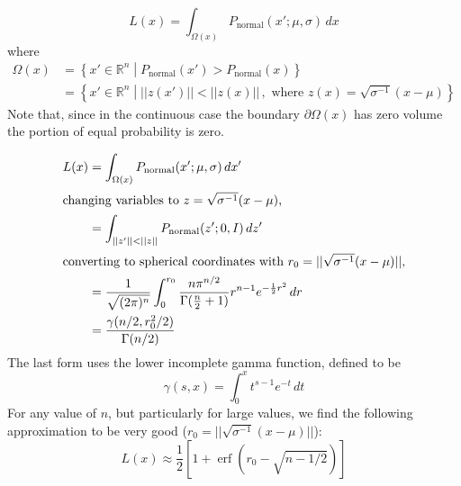 \documentclass{article}
\newcommand{\R}{\mathbb{R}}
\DeclareMathOperator{\erf}{erf}
\begin{document}
\begin{equation}
L(x)=\int_{\Omega(x)} P_{\text{normal}}(x';\mu,\sigma) \,dx
\end{equation}
where 
\begin{align}
\Omega(x) &= \left\{ x' \in \R^n \middle| P_{\text{normal}}(x') > P_{\text{normal}}(x) \right\} \\
          &= \left\{ x' \in \R^n \middle| ||z(x')|| < ||z(x)||\,,\text{ where } z(x)=\sqrt{\sigma^{-1}} (x-\mu) \right\}
\end{align}
Note that, since in the continuous case the boundary $\partial \Omega(x)$ has zero volume the portion of equal probability is zero.

\begin{align}
L(x)&=\int_{\Omega(x)} P_{\text{normal}}(x';\mu,\sigma) \,dx' \\
\intertext{changing variables to $z=\sqrt{\sigma^{-1}} (x-\mu)$,}
    &=\int_{||z'||<||z||}  P_{\text{normal}}(z';0,I) \, dz' \\
\intertext{converting to spherical coordinates with $r_0 = ||\sqrt{\sigma^{-1}} (x-\mu)||$,}
    &=\frac{1}{\sqrt{(2\pi)^{n}}} \int_{0}^{r_0} \frac{n \pi^{n/2}}{\Gamma(\frac{n}{2}+1)} r^{n-1} e^{-\frac{1}{2} r^2} \, dr \\
    &=\frac{\gamma(n/2,r_0^2/2)}{\Gamma(n/2)}
\end{align}
The last form uses the lower incomplete gamma function, defined to be
\begin{equation}
\gamma(s,x) = \int_0^{x} t^{s-1} e^{-t} \, dt
\end{equation}
For any value of $n$, but particularly for large values, we find the following approximation to be very good ($r_0 = ||\sqrt{\sigma^{-1}} (x-\mu)||$):
\begin{equation}
L(x) \approx \frac{1}{2}\left[1+\erf(r_0-\sqrt{n-1/2})\right]
\end{equation}
\end{document}
